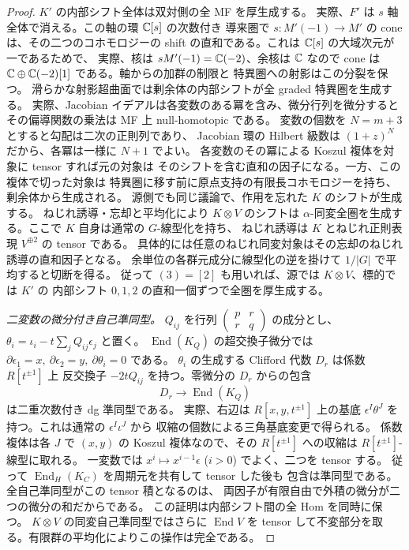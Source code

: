 \begin{proof}
$K'$ の内部シフト全体は双対側の全 MF を厚生成する。
実際、$F'$ は $s$ 軸全体で消える。この軸の環 $\mathbb C[s]$ の次数付き
導来圏で $s:M'(-1)\to M'$ の cone は、その二つのコホモロジーの
shift の直和である。これは $\mathbb C[s]$ の大域次元が一であるためで、
実際、核は $sM'(-1)=\mathbb C(-2)$、余核は $\mathbb C$ なので
cone は $\mathbb C\oplus\mathbb C(-2)[1]$ である。軸からの加群の制限と
特異圏への射影はこの分裂を保つ。
滑らかな射影超曲面では剰余体の内部シフトが全 graded 特異圏を生成する。
実際、Jacobian イデアルは各変数のある冪を含み、微分行列を微分すると
その偏導関数の乗法は MF 上 null-homotopic である。
変数の個数を $N=m+3$ とすると勾配は二次の正則列であり、
Jacobian 環の Hilbert 級数は $(1+z)^N$ だから、各冪は一様に $N+1$ でよい。
各変数のその冪による Koszul 複体を対象に tensor すれば元の対象は
そのシフトを含む直和の因子になる。一方、この複体で切った対象は
特異圏に移す前に原点支持の有限長コホモロジーを持ち、剰余体から生成される。
源側でも同じ議論で、作用を忘れた $K$ のシフトが生成する。
ねじれ誘導・忘却と平均化により $K\otimes V$ のシフトは
$\alpha$-同変全圏を生成する。ここで $K$ 自身は通常の $G$-線型化を持ち、
ねじれ誘導は $K$ とねじれ正則表現 $V^{\oplus2}$ の tensor である。
具体的には任意のねじれ同変対象はその忘却のねじれ誘導の直和因子となる。
余単位の各群元成分に線型化の逆を掛けて $1/|G|$ で平均すると切断を得る。
従って $(3)=[2]$ も用いれば、源では $K\otimes V$、標的では $K'$ の
内部シフト $0,1,2$ の直和一個ずつで全圏を厚生成する。

\emph{二変数の微分付き自己準同型。}
$Q_{ij}$ を行列 $\left(\begin{smallmatrix}p&r\\r&q\end{smallmatrix}\right)$
の成分とし、$\theta_i=\iota_i-t\sum_j Q_{ij}\epsilon_j$ と置く。
$\operatorname{End}(K_Q)$ の超交換子微分では
$\partial\epsilon_1=x,\ \partial\epsilon_2=y,\ \partial\theta_i=0$ である。
$\theta_i$ の生成する Clifford 代数 $D_r$ は係数 $R[t^{\pm1}]$ 上
反交換子 $-2tQ_{ij}$ を持つ。零微分の $D_r$ からの包含
\[
             D_r\longrightarrow\operatorname{End}(K_Q)
\]
は二重次数付き dg 準同型である。
実際、右辺は $R[x,y,t^{\pm1}]$ 上の基底
$\epsilon^I\theta^J$ を持つ。これは通常の $\epsilon^I\iota^J$ から
収縮の個数による三角基底変更で得られる。
係数複体は各 $J$ で $(x,y)$ の Koszul 複体なので、その
$R[t^{\pm1}]$ への収縮は $R[t^{\pm1}]$-線型に取れる。
一変数では $x^i\mapsto x^{i-1}\epsilon$ ($i>0$) でよく、二つを tensor する。
従って $\operatorname{End}_H(K_C)$ を周期元を共有して tensor した後も
包含は準同型である。全自己準同型がこの tensor 積となるのは、
両因子が有限自由で外積の微分が二つの微分の和だからである。
この証明は内部シフト間の全 Hom を同時に保つ。
$K\otimes V$ の同変自己準同型ではさらに $\operatorname{End}V$ を
tensor して不変部分を取る。有限群の平均化によりこの操作は完全である。


\end{proof}
